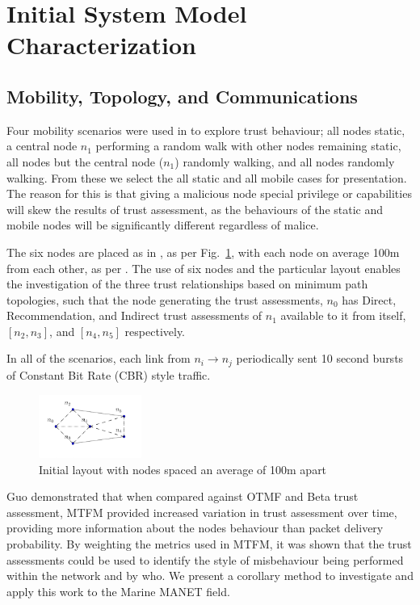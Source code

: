\documentclass[conference]{IEEEtran}
\begin{document}
\section{Initial System Model Characterization}\label{sec:initialsystemcharacterization}

\subsection{Mobility, Topology, and Communications}

Four mobility scenarios were used in \cite{Guo11} to explore trust behaviour; all nodes static, a central node $n_1$ performing a random walk with other nodes remaining static, all nodes but the central node ($n_1$) randomly walking, and all nodes randomly walking. From these we select the all static and all mobile cases for presentation.
The reason for this is that giving a malicious node special privilege or capabilities will skew the results of trust assessment, as the behaviours of the static and mobile nodes will be significantly different regardless of malice.

The six nodes are placed as in \cite{Guo11}, as per Fig.~\ref{fig:s1_layout}, with each node on average 100m from each other, as per \cite{Guo11}.
The use of six nodes and the particular layout enables the investigation of the three trust relationships based on minimum path topologies, such that the node generating the trust assessments, $n_0$ has Direct, Recommendation, and Indirect trust assessments of $n_1$ available to it from itself, $[n_2,n_3]$, and $[n_4,n_5]$ respectively.

In all of the scenarios, each link from $n_i \rightarrow n_j$ periodically sent 10 second bursts of Constant Bit Rate (CBR) style traffic.
%
\begin{figure}[h]
  \centering
  \includegraphics[width=0.3\textwidth]{img/s1_layout.pdf}
  \caption{Initial layout with nodes spaced an average of 100m apart}
  \label{fig:s1_layout}
\end{figure}
%
Guo demonstrated that when compared against OTMF and Beta trust assessment, MTFM provided increased variation in trust assessment over time, providing more information about the nodes behaviour than packet delivery probability. 
By weighting the metrics used in MTFM, it was shown that the trust assessments could be used to identify the style of misbehaviour being performed within the network and by who.
We present a corollary method to investigate and apply this work to the Marine MANET field.
\end{document}
